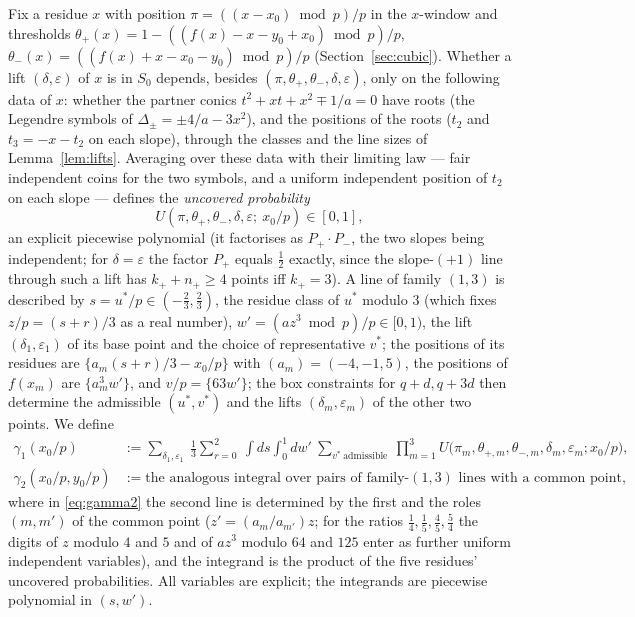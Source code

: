 Fix a residue $x$ with position $\pi=((x-x_0)\bmod p)/p$ in the $x$-window and thresholds $\theta_+(x)=1-((f(x)-x-y_0+x_0)\bmod p)/p$,
$\theta_-(x)=((f(x)+x-x_0-y_0)\bmod p)/p$ (Section~\ref{sec:cubic}).  Whether a lift $(\delta,\varepsilon)$ of $x$ is in $S_0$ depends, besides
$(\pi,\theta_+,\theta_-,\delta,\varepsilon)$, only on the following data of $x$: whether the partner conics $t^2+xt+x^2\mp1/a=0$ have roots (the
Legendre symbols of $\Delta_\pm=\pm4/a-3x^2$), and the positions of the roots ($t_2$ and $t_3=-x-t_2$ on each slope), through the classes and the line
sizes of Lemma~\ref{lem:lifts}.  Averaging over these data with their limiting law — fair independent coins for the two symbols, and a uniform independent
position of $t_2$ on each slope — defines the \emph{uncovered probability}
\[
 U(\pi,\theta_+,\theta_-,\delta,\varepsilon;\ x_0/p)\in[0,1],
\]
an explicit piecewise polynomial (it factorises as $P_+\cdot P_-$, the two slopes being independent; for $\delta=\varepsilon$ the factor $P_+$ equals
$\tfrac12$ exactly, since the slope-$(+1)$ line through such a lift has $k_++n_+\ge4$ points iff $k_+=3$).
A line of family $(1,3)$ is described by $s=u^*/p\in(-\tfrac23,\tfrac23)$, the residue class of $u^*$ modulo $3$ (which fixes $z/p=(s+r)/3$ as a real number),
$w'=(az^3\bmod p)/p\in[0,1)$, the lift $(\delta_1,\varepsilon_1)$ of its base point and the choice of representative $v^*$; the positions of its residues are
$\{a_m(s+r)/3-x_0/p\}$ with $(a_m)=(-4,-1,5)$, the positions of $f(x_m)$ are $\{a_m^3w'\}$, and $v/p=\{63w'\}$; the box constraints for $q+d,q+3d$ then
determine the admissible $(u^*,v^*)$ and the lifts $(\delta_m,\varepsilon_m)$ of the other two points.  We define
\begin{align}
 \gamma_1(x_0/p)&:=\sum_{\delta_1,\varepsilon_1}\ \frac13\sum_{r=0}^{2}\ \int ds\int_0^1dw'\ \sum_{v^*\ \mathrm{admissible}}\ \prod_{m=1}^3
 U\bigl(\pi_m,\theta_{+,m},\theta_{-,m},\delta_m,\varepsilon_m;x_0/p\bigr),\label{eq:gamma1}\\
 \gamma_2(x_0/p,y_0/p)&:=\text{the analogous integral over pairs of family-$(1,3)$ lines with a common point,}\label{eq:gamma2}
\end{align}
where in \eqref{eq:gamma2} the second line is determined by the first and the roles $(m,m')$ of the common point ($z'=(a_m/a_{m'})z$; for the ratios
$\tfrac14,\tfrac15,\tfrac45,\tfrac54$ the digits of $z$ modulo $4$ and $5$ and of $az^3$ modulo $64$ and $125$ enter as further uniform independent
variables), and the integrand is the product of the five residues' uncovered probabilities.  All variables are explicit; the integrands are piecewise
polynomial in $(s,w')$.

